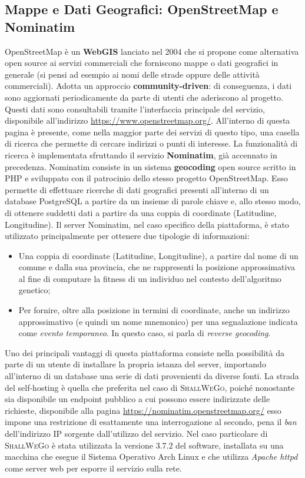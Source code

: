     \subsection{Mappe e Dati Geografici: OpenStreetMap e Nominatim}
        OpenStreetMap è un \textbf{WebGIS} lanciato nel 2004 che si propone come alternativa open source ai servizi commerciali che forniscono mappe o dati geografici in generale (si pensi ad esempio ai nomi delle strade oppure delle attività commerciali). Adotta un approccio \textbf{community-driven}: di conseguenza, i dati sono aggiornati periodicamente da parte di utenti che aderiscono al progetto. Questi dati sono consultabili tramite l'interfaccia principale del servizio, disponibile all'indirizzo \url{https://www.openstreetmap.org/}. All'interno di questa pagina è presente, come nella maggior parte dei servizi di questo tipo, una casella di ricerca che permette di cercare indirizzi o punti di interesse. La funzionalità di ricerca è implementata sfruttando il servizio \textbf{Nominatim}, già accennato in precedenza.
        Nominatim consiste in un sistema \textbf{geocoding} open source scritto in PHP e sviluppato con il patrocinio dello stesso progetto OpenStreetMap. Esso permette di effettuare ricerche di dati geografici presenti all'interno di un database PostgreSQL a partire da un insieme di parole chiave e, allo stesso modo, di ottenere suddetti dati a partire da una coppia di coordinate (Latitudine, Longitudine).
        Il server Nominatim, nel caso specifico della piattaforma, è stato utilizzato principalmente per ottenere due tipologie di informazioni:
        \begin{itemize}
            \item Una coppia di coordinate (Latitudine, Longitudine), a partire dal nome di un comune e dalla sua provincia, che ne rappresenti la posizione approssimativa al fine di computare la fitness di un individuo nel contesto dell'algoritmo genetico;
            \item Per fornire, oltre alla posizione in termini di coordinate, anche un indirizzo approssimativo (e quindi un nome mnemonico) per una segnalazione indicata come \textit{evento temporaneo}. In questo caso, si parla di \textit{reverse geocoding}.
        \end{itemize}
        Uno dei principali vantaggi di questa piattaforma consiste nella possibilità da parte di un utente di installare la propria istanza del server, importando all'interno di un database una serie di dati provenienti da diverse fonti. 
        La strada del self-hosting è quella che preferita nel caso di \textsc{ShallWeGo}, poiché nonostante sia disponibile un endpoint pubblico a cui possono essere indirizzate delle richieste, disponibile alla pagina \url{https://nominatim.openstreetmap.org/} esso impone una restrizione di esattamente una interrogazione al secondo, pena il \textit{ban} dell'indirizzo IP sorgente dall'utilizzo del servizio. 
        Nel caso particolare di \textsc{ShallWeGo} è stata utilizzata la versione 3.7.2 del software, installata su una macchina che esegue il Sistema Operativo Arch Linux e che utilizza \textit{Apache httpd} come server web per esporre il servizio sulla rete.

